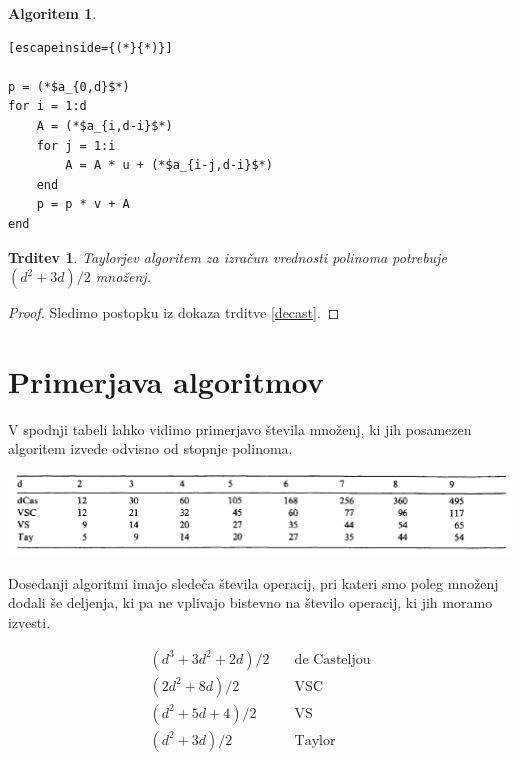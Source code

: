 \documentclass{article}
\newtheorem{algoritm}{Algoritem}[section]
\newtheorem{trditev}{Trditev}[section]
\begin{document}
\begin{algoritm}
\begin{lstlisting}[escapeinside={(*}{*)}]

p = (*$a_{0,d}$*)
for i = 1:d
    A = (*$a_{i,d-i}$*)
    for j = 1:i
        A = A * u + (*$a_{i-j,d-i}$*)
    end
    p = p * v + A
end
\end{lstlisting}
\end{algoritm}

\begin{trditev}
Taylorjev algoritem za izračun vrednosti polinoma potrebuje $(d^2+3d)/2$ množenj.
\end{trditev}

\begin{proof}
Sledimo postopku iz dokaza trditve \ref{decast}.
\end{proof}

\section{Primerjava algoritmov}

V spodnji tabeli lahko vidimo primerjavo števila množenj, ki jih posamezen algoritem izvede odvisno od stopnje polinoma.

\begin{center}
\includegraphics[width=.9\linewidth]{tabelca.PNG}
\end{center}

 Dosedanji algoritmi imajo sledeča števila operacij, pri kateri smo poleg množenj dodali še deljenja, ki pa ne vplivajo bistevno na število operacij, ki jih moramo izvesti.

\begin{align}
(d^3+3d^2+2d)/2& \quad \text{de Casteljou} \nonumber \\
(2d^2+8d)/2& \quad \text{VSC} \nonumber \\
(d^2+5d+4)/2& \quad \text{VS} \nonumber \\
(d^2+3d)/2& \quad \text{Taylor} \nonumber
\end{align}
\end{document}
